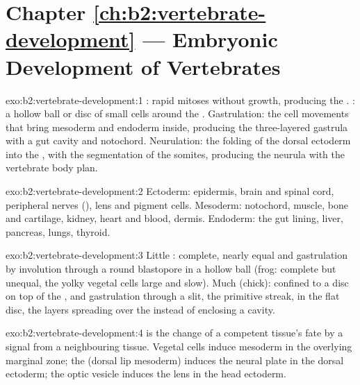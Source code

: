 \section*{Chapter \ref{ch:b2:vertebrate-development} --- Embryonic Development of Vertebrates}

\begin{solution}{exo:b2:vertebrate-development:1}
: rapid mitoses without growth, producing the .
: a hollow ball or disc of small cells around the
. Gastrulation: the cell movements that bring mesoderm and
endoderm inside, producing the three-layered gastrula with a gut
cavity and notochord. Neurulation: the folding of the dorsal
ectoderm into the , with the segmentation of the somites,
producing the neurula with the vertebrate body plan.
\end{solution}

\begin{solution}{exo:b2:vertebrate-development:2}
Ectoderm: epidermis, brain and spinal cord, peripheral nerves
(), lens and pigment cells. Mesoderm: notochord, muscle,
bone and cartilage, kidney, heart and blood, dermis. Endoderm: the
gut lining, liver, pancreas, lungs, thyroid.
\end{solution}

\begin{solution}{exo:b2:vertebrate-development:3}
Little : complete, nearly equal  and gastrulation by
involution through a round blastopore in a hollow ball (frog:
complete but unequal, the yolky vegetal cells large and slow). Much
 (chick):  confined to a disc on top of the , and
gastrulation through a slit, the primitive streak, in the flat
disc, the layers spreading over the  instead of enclosing a
cavity.
\end{solution}

\begin{solution}{exo:b2:vertebrate-development:4}
 is the change of a competent tissue's fate by a signal
from a neighbouring tissue. Vegetal cells induce mesoderm in the
overlying marginal zone; the  (dorsal lip mesoderm) induces
the neural plate in the dorsal ectoderm; the optic vesicle induces
the lens in the head ectoderm.
\end{solution}

